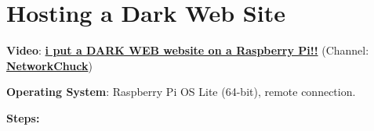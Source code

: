 \section{Hosting a Dark Web Site}

\noindent \textbf{Video}: \href{https://www.youtube.com/watch?v=bllS9tkCkaM}{\textbf{\color{blue}i put a DARK WEB website on a Raspberry Pi!!}} (Channel: \href{https://www.youtube.com/@NetworkChuck}{\textbf{\color{blue}NetworkChuck}})

\vspace{0.5cm}

\noindent \textbf{Operating System}: Raspberry Pi OS Lite (64-bit), remote connection.

\vspace{0.5cm}

\noindent \textbf{Steps:}


